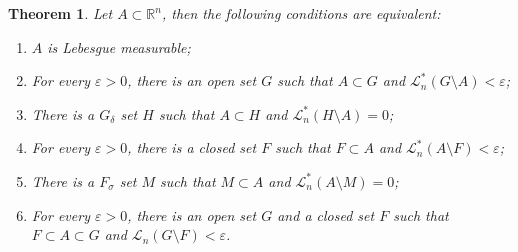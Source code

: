 \documentclass[11pt]{book}
\newtheorem{theorem}{Theorem}[chapter]
\theoremstyle{definition}
\numberwithin{equation}{chapter}
\def\L{{\mathcal L}}
\begin{document}
\begin{theorem}\label{theorem_124}
Let $A \subset \mathbb{R}^n$, then the following conditions are equivalent:
\begin{enumerate}[label=(\alph*)]
    \item $A$ is Lebesgue measurable;
    
    \item For every $\varepsilon > 0$, there is an open set $G$ such that $A \subset G$ and $\L^*_n(G\setminus A) < \varepsilon$;
    
    \item There is a $G_\delta$ set $H$ such that $A \subset H$ and $\L^*_n(H\setminus A) = 0$;
    
    \item For every $\varepsilon > 0$, there is a closed set $F$ such that $F \subset A$ and $\L^*_n(A\setminus F) < \varepsilon$;
    
    \item There is a $F_\sigma$ set $M$ such that $M \subset A$ and $\L^*_n(A\setminus M) = 0$;
    
    \item For every $\varepsilon > 0$, there is an open set $G$ and a closed set $F$ such that $F \subset A \subset G$ and $\L_n(G \setminus F) < \varepsilon$.
\end{enumerate}
\end{theorem}
\end{document}
